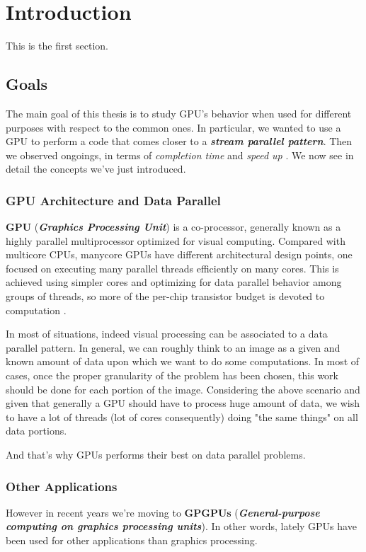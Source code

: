 
\chapter{Introduction}
	\label{chap:intro}
	This is the first section.
	\section{Goals}
		The main goal of this thesis is to study GPU's behavior when used for different purposes with respect to the common ones.
		In particular, we wanted to use a GPU to perform a code that comes closer to a \textit{\textbf{stream parallel pattern}}.	
		Then we observed ongoings, in terms of  \textit{completion time} and \textit{speed up }.
		We now see in detail the concepts we've just introduced.

	\subsection{GPU Architecture and Data Parallel}
		\textbf{GPU} (\textbf{\textit{Graphics Processing Unit}}) is a co-processor, generally known as a highly parallel multiprocessor optimized for visual computing.
		Compared with multicore CPUs, manycore GPUs have different architectural design points, one focused on executing many parallel threads efficiently on many cores.
		This is achieved using simpler  cores  and  optimizing  for  data parallel  behavior  among  groups  of  threads, so more  of  the  per-chip  transistor  budget  is  devoted to computation \cite{pattersonhennessy}.
		
		In most of situations, indeed visual processing can be associated to a data parallel pattern.
		In general, we can roughly think to an image as a given and known amount of data upon which we want to do some computations. In most of cases, once the proper granularity of the problem has been chosen, this work should be done for each portion of the image.
		Considering the above scenario and given that generally a GPU should have to process huge amount of data, we wish to have a lot of threads (lot of cores consequently) doing "the same things" on all data portions.
		
		And that's why GPUs performs their best on data parallel problems. 
	
	\subsection{Other Applications}
	\label{subs:otherApps}
		However in recent years we're moving to \textbf{GPGPUs} (\textbf{\textit{General-purpose computing on graphics processing units}}).
		In other words, lately GPUs have been used for other applications than graphics processing.
		
